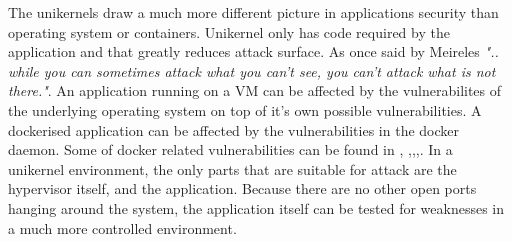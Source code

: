 The unikernels draw a much more different picture in applications security than operating system or containers. Unikernel only has code required by the application and that greatly reduces attack surface. As once said by Meireles \cite{mailing-list} \textit{".. while you can sometimes attack what you can't see, you can't attack what is not there."}. An application running on a VM can be affected by the vulnerabilites of the underlying operating system on top of it's own possible vulnerabilities. A dockerised application can be affected by the vulnerabilities in the docker daemon. Some of docker related vulnerabilities can be found in \cite{CVE-2019-14271-details}, \cite{CVE-2018-9862-details},\cite{CVE-2018-8115-details},\cite{CVE-2018-11757-details},\cite{CVE-2019-5736-details}. In a unikernel environment, the only parts that are suitable for attack are the hypervisor itself, and the application. Because there are no other open ports hanging around the system, the application itself can be tested for weaknesses in a much more controlled environment.

